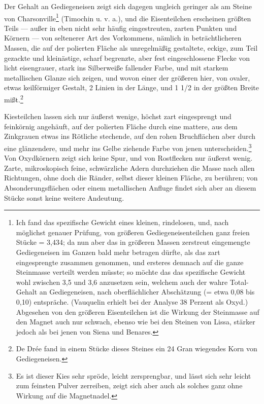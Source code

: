 \documentclass[a4paper, 11pt, oneside, german]{article}
\begin{document}
Der Gehalt an Gediegeneisen zeigt sich dagegen ungleich geringer als am Steine von Charsonville\footnote{Ich fand das spezifische Gewicht eines kleinen, rindelosen, und, nach möglichst genauer Prüfung, von größeren Gediegeneisenteilchen ganz freien Stücke = 3,434; da nun aber das in größeren Massen zerstreut eingemengte Gediegeneisen im Ganzen bald mehr betragen dürfte, als das zart eingesprengte zusammen genommen, und ersteres demnach auf die ganze Steinmasse verteilt werden müsste; so möchte das das spezifische Gewicht wohl zwischen 3,5 und 3,6 anzusetzen sein, welchem auch der wahre Total-Gehalt an Gediegeneisen, nach oberflächlicher Abschätzung (= etwa 0,08 bis 0,10) entspräche. (Vauquelin erhielt bei der Analyse 38 Perzent als Oxyd.) Abgesehen von den größeren Eisenteilchen ist die Wirkung der Steinmasse auf den Magnet auch nur schwach, ebenso wie bei den Steinen von Lissa, stärker jedoch als bei jenen von Siena und Benares.} (Timochin u. v. a.), und die Eisenteilchen erscheinen größten Teils --- außer in eben nicht sehr häufig eingestreuten, zarten Punkten und Körnern --- von seltenerer Art des Vorkommens, nämlich in beträchtlicheren Massen, die auf der polierten Fläche als unregelmäßig gestaltete, eckige, zum Teil gezackte und kleinästige, scharf begrenzte, aber fest eingeschlossene Flecke von licht eisengrauer, stark ins Silberweiße fallender Farbe, und mit starkem metallischen Glanze sich zeigen, und wovon einer der größeren hier, von ovaler, etwas keilförmiger Gestalt, 2 Linien in der Länge, und 1 1/2 in der größten Breite mißt.\footnote{De Drée fand in einem Stücke dieses Steines ein 24 Gran wiegendes Korn von Gediegeneisen.}

Kiesteilchen lassen sich nur äußerst wenige, höchst zart eingesprengt und feinkörnig angehäuft, auf der polierten Fläche durch eine mattere, aus dem Zinkgrauen etwas ins Rötliche stechende, auf den rohen Bruchflächen aber durch eine glänzendere, und mehr ins Gelbe ziehende Farbe von jenen unterscheiden.\footnote{Es ist dieser Kies sehr spröde, leicht zersprengbar, und lässt sich sehr leicht zum feinsten Pulver zerreiben, zeigt sich aber auch als solches ganz ohne Wirkung auf die Magnetnadel.} Von Oxydkörnern zeigt sich keine Spur, und von Rostflecken nur äußerst wenig. Zarte, mikroskopisch feine, schwärzliche Adern durchziehen die Masse nach allen Richtungen, ohne doch die Ränder, selbst dieser kleinen Fläche, zu berühren; von Absonderungsflächen oder einem metallischen Anfluge findet sich aber an diesem Stücke sonst keine weitere Andeutung.
\end{document}
